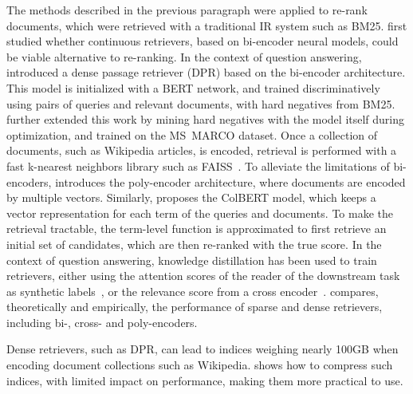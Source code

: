 \documentclass[10pt]{article} %
\newcommand{\gi}[1]{}
\begin{document}
The methods described in the previous paragraph were applied to re-rank documents, which were retrieved with a traditional IR system such as BM25.
\citet{gillick2018end} first studied whether continuous retrievers, based on bi-encoder neural models, could be viable alternative to re-ranking.
In the context of question answering, \citet{karpukhin2020dense} introduced a dense passage retriever (DPR) based on the bi-encoder architecture.
This model is initialized with a BERT network, and trained discriminatively using pairs of queries and relevant documents, with hard negatives from BM25.
\citet{xiong2020approximate} further extended this work by mining hard negatives with the model itself during optimization, and trained on the MS~MARCO dataset.
Once a collection of documents, such as Wikipedia articles, is encoded, retrieval is performed with a fast k-nearest neighbors library such as FAISS~\cite{johnson2019billion}.
To alleviate the limitations of bi-encoders, \citet{humeau2019poly} introduces the poly-encoder architecture, where documents are encoded by multiple vectors.
Similarly, \citet{khattab2020relevanceguided} proposes the ColBERT model, which keeps a vector representation for each term of the queries and documents.
To make the retrieval tractable, the term-level function is approximated to first retrieve an initial set of candidates, which are then re-ranked with the true score.
In the context of question answering, knowledge distillation has been used to train retrievers, either using
the attention scores of the reader of the downstream task as synthetic labels~\citep{izacard2020distilling}, or the relevance score from a cross encoder~\citep{yang2020retriever}.
\citet{luan2020sparse} compares, theoretically and empirically, the performance of sparse and dense retrievers, including bi-, cross- and poly-encoders.
\gi{this last paragraph sounds out of context, maybe we should delete it?}
Dense retrievers, such as DPR, can lead to indices weighing nearly 100GB when encoding document collections such as Wikipedia.
\citet{izacard2020memory} shows how to compress such indices, with limited impact on performance, making them more practical to use.
\end{document}
